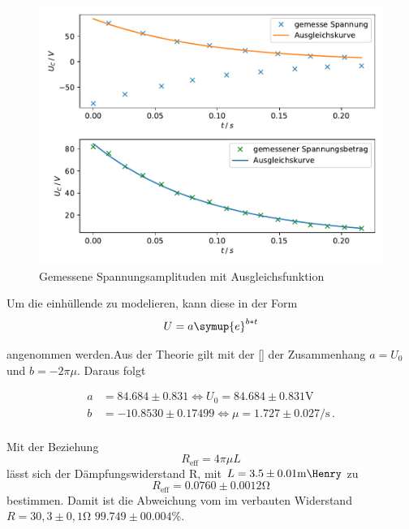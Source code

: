 \newpage
\begin{figure}
    \centering
    \label{fig:1}
    \includegraphics{Daten/a.pdf}
    \caption{Gemessene Spannungsamplituden mit Ausgleichsfunktion}
\end{figure}

Um die einhüllende zu modelieren, kann diese in der Form
\begin{equation}
    U = a \symup{e}^{b*t}
\end{equation}

\noindent
angenommen werden.Aus der Theorie gilt mit der \autoref{} der Zusammenhang $a = U_0$ und $b = -2 \pi \mu$. Daraus folgt %


\begin{align*}
    a &= 84.684 \pm 0.831 \Leftrightarrow U_0 = 84.684 \pm 0.831 \si{\volt} \\
    b &= -10.8530 \pm 0.17499 \Leftrightarrow \mu = 1.727 \pm 0.027 \si{\per\second} \, .\\
\end{align*}

Mit der Beziehung 
\begin{equation}
    R_\text{eff} = 4\pi\mu L 
\end{equation}
lässt sich der Dämpfungswiderstand R, mit $L = 3.5 \pm 0.01 \si{\milli\Henry}$ zu
\begin{equation*}
    R_\text{eff} = 0.0760 \pm 0.0012 \si{\ohm}
\end{equation*}
bestimmen. Damit ist die Abweichung vom im verbauten Widerstand $R = 30,3 \pm 0,1 \si{\ohm}$ $99.749 \pm 00.004 \si{\percent}$.

